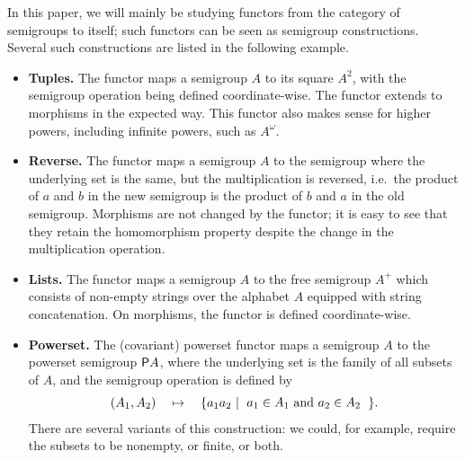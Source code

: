  \begin{myexample}\label{ex:functors}
    In this paper, we will mainly be studying functors from the category of semigroups to itself; such functors can be seen as semigroup constructions.  Several such constructions are listed in the following example. 
    \begin{itemize}
        \item {\bf Tuples.} The functor maps a semigroup $A$ to its square $A^2$, with the semigroup operation being defined coordinate-wise. The functor extends to morphisms in the expected way. This functor also makes sense for higher powers, including infinite powers, such as $A^\omega$.
        \item {\bf Reverse. } The functor maps a semigroup $A$ to the semigroup where the underlying set is the same, but the multiplication is reversed, i.e.~the product of $a$ and $b$ in the new semigroup is the product of $b$ and $a$ in the old semigroup. Morphisms are not changed by the functor; it is easy to see that they retain the homomorphism property despite the change in the multiplication operation.
        \item {\bf Lists.} The functor maps a semigroup $A$ to the free semigroup $A^+$ which consists of non-empty strings over the alphabet $A$  equipped with string concatenation. On morphisms, the functor is defined coordinate-wise. 
        \item {\bf Powerset.} The (covariant) powerset functor maps a semigroup $A$ to the powerset semigroup $\mathsf P A$, where the underlying set is the family of all subsets of $A$, and the semigroup operation is defined by 
        \begin{align*}
        (A_1,A_2) \quad \mapsto \quad \setbuild{a_1 a_2}{$a_1 \in A_1$ and $a_2 \in A_2$}.
        \end{align*}
        There are several variants of this construction: we could, for example,  require the subsets to be nonempty, or finite, or both.
    \end{itemize}
 \end{myexample}

